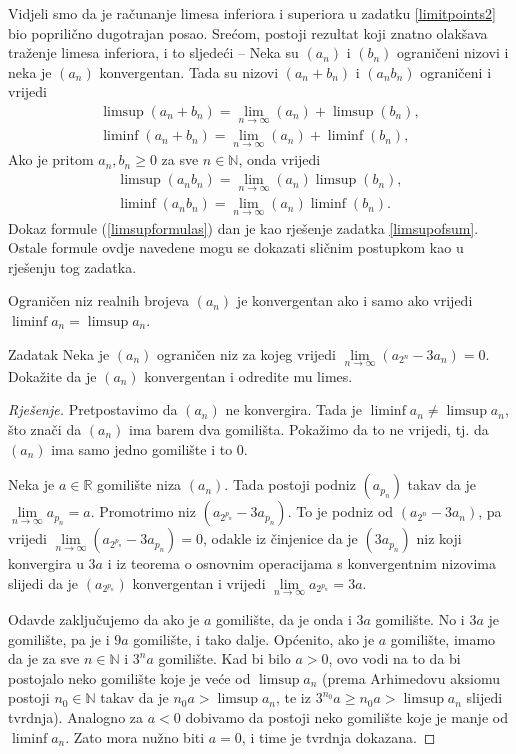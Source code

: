 \begin{remark}
Vidjeli smo da je računanje limesa inferiora i superiora u zadatku \ref{limitpoints2} bio poprilično dugotrajan posao. Srećom, postoji rezultat koji znatno olakšava traženje limesa inferiora, i to sljedeći -- Neka su \((a_n)\) i \((b_n)\) ograničeni nizovi i neka je \((a_n)\) konvergentan. Tada su nizovi \((a_n+b_n)\) i \((a_nb_n)\) ograničeni i vrijedi
\begin{gather}
\label{limsupformulas}
\limsup(a_n+b_n)=\lim\limits_{n\to \infty}(a_n)+\limsup(b_n),\\
\liminf(a_n+b_n)=\lim\limits_{n\to \infty}(a_n)+\liminf(b_n),
\end{gather}
Ako je pritom $a_n, b_n\geq 0$ za sve $n\in \mathbb{N}$, onda vrijedi
\begin{gather}
\limsup(a_nb_n)=\lim\limits_{n\to \infty}(a_n)\limsup(b_n),\\
\liminf(a_nb_n)=\lim\limits_{n\to \infty}(a_n)\liminf(b_n).
\end{gather}
Dokaz formule (\ref{limsupformulas}) dan je kao rješenje zadatka \ref{limsupofsum}. Ostale formule ovdje navedene mogu se dokazati sličnim postupkom kao u rješenju tog zadatka.
\end{remark}
\begin{remark}
Ograničen niz realnih brojeva \((a_n)\) je konvergentan ako i samo ako vrijedi \(\liminf{a_n}=\limsup{a_n}\).
\end{remark}
\begin{exercise}{Zadatak}
\label{iteraaaate}
Neka je \((a_n)\) ograničen niz za kojeg vrijedi \(\lim\limits_{n\to \infty}{(a_{2^n}-3a_n)}=0\). Dokažite da je \((a_n)\) konvergentan i odredite mu limes.
\end{exercise}
\begin{proof}[Rješenje]
Pretpostavimo da \((a_n)\) ne konvergira. Tada je \(\liminf{a_n}\neq \limsup{a_n}\), što znači da \((a_n)\) ima barem dva gomilišta. Pokažimo da to ne vrijedi, tj. da \((a_n)\) ima samo jedno gomilište i to \(0\).

Neka je \(a\in \mathbb{R}\) gomilište niza \((a_n)\). Tada postoji podniz \((a_{p_n})\) takav da je \(\lim\limits_{n\to \infty}{a_{p_n}}=a\). Promotrimo niz \((a_{2^{p_n}}-3a_{p_n})\). To je podniz od \((a_{2^n}-3a_n)\), pa vrijedi \(\lim\limits_{n\to \infty}{(a_{2^{p_n}}-3a_{p_n})}=0\), odakle iz činjenice da je \((3a_{p_n})\) niz koji konvergira u \(3a\) i iz teorema o osnovnim operacijama s konvergentnim nizovima slijedi da je \((a_{2^{p_n}})\) konvergentan i vrijedi \(\lim\limits_{n\to \infty}{a_{2^{p_n}}}=3a\).

Odavde zaključujemo da ako je \(a\) gomilište, da je onda i \(3a\) gomilište. No i \(3a\) je gomilište, pa je i \(9a\) gomilište, i tako dalje. Općenito, ako je \(a\) gomilište, imamo da je za sve \(n\in \mathbb{N}\) i \(3^na\) gomilište. Kad bi bilo \(a>0\), ovo vodi na to da bi postojalo neko gomilište koje je veće od \(\limsup{a_n}\) (prema Arhimedovu aksiomu postoji \(n_0\in \mathbb{N}\) takav da je \(n_0a>\limsup{a_n}\), te iz \(3^{n_0}a\geq n_0a>\limsup{a_n}\) slijedi tvrdnja). Analogno za \(a<0\) dobivamo da postoji neko gomilište koje je manje od \(\liminf{a_n}\). Zato mora nužno biti \(a=0\), i time je tvrdnja dokazana.
\end{proof}
